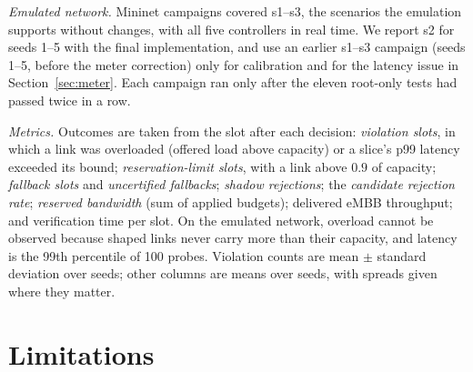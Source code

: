 \documentclass[conference]{IEEEtran}
\begin{document}
\emph{Emulated network.} Mininet campaigns covered s1--s3, the scenarios the
emulation supports without changes, with all five controllers in real time. We
report s2 for seeds 1--5 with the final implementation, and use an earlier s1--s3
campaign (seeds 1--5, before the meter correction) only for calibration and for the
latency issue in Section~\ref{sec:meter}. Each campaign ran only after the eleven
root-only tests had passed twice in a row.

\emph{Metrics.} Outcomes are taken from the slot after each decision:
\emph{violation slots}, in which a link was overloaded (offered load above capacity)
or a slice's p99 latency exceeded its bound; \emph{reservation-limit slots}, with a
link above $0.9$ of capacity; \emph{fallback slots} and \emph{uncertified
fallbacks}; \emph{shadow rejections}; the \emph{candidate rejection rate};
\emph{reserved bandwidth} (sum of applied budgets); delivered eMBB throughput; and
verification time per slot. On the emulated network, overload cannot be observed
because shaped links never carry more than their capacity, and latency is the 99th
percentile of 100 probes. Violation counts are mean $\pm$ standard deviation over
seeds; other columns are means over seeds, with spreads given where they matter.



\section{Limitations}
\label{sec:limits}
\end{document}
